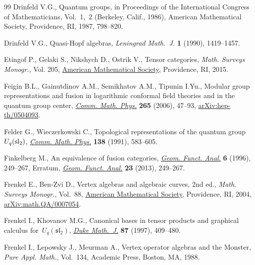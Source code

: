 \documentclass[pdftex]{sigma}
\numberwithin{equation}{section}
\begin{document}
\begin{thebibliography}{99}
Drinfeld V.G., Quantum groups, in Proceedings of the {I}nternational {C}ongress
 of {M}athematicians, {V}ol.~1,~2 ({B}erkeley, {C}alif., 1986), American
 Mathematical Society, Providence, RI, 1987, 798--820.

Drinfeld V.G., Quasi-{H}opf algebras, \textit{Leningrad Math.~J.} \textbf{1}
 (1990), 1419--1457.

Etingof P., Gelaki S., Nikshych D., Ostrik V., Tensor categories, \textit{Math.
 Surveys Monogr.}, Vol. 205, \href{https://doi.org/10.1090/surv/205}{American
 Mathematical Society}, Providence, RI, 2015.

Feigin B.L., Gainutdinov A.M., Semikhatov A.M., Tipunin I.Yu., Modular group
 representations and fusion in logarithmic conformal field theories and in the
 quantum group center,
 \href{https://doi.org/10.1007/s00220-006-1551-6}{\textit{Comm. Math. Phys.}}
 \textbf{265} (2006), 47--93,
 \href{http://arxiv.org/abs/hep-th/0504093}{arXiv:hep-th/0504093}.

Felder G., Wieczerkowski C., Topological representations of the quantum
 group~{$U_q({\rm sl}_2)$},
 \href{https://doi.org/10.1007/BF02102043}{\textit{Comm. Math. Phys.}}
 \textbf{138} (1991), 583--605.

Finkelberg M., An equivalence of fusion categories,
 \href{https://doi.org/10.1007/BF02247887}{\textit{Geom. Funct. Anal.}}
 \textbf{6} (1996), 249--267, {E}rratum,
 \href{https://doi.org/10.1007/s00039-013-0230-y}{\textit{Geom. Funct. Anal.}}
 \textbf{23} (2013), 249--267.

Frenkel E., Ben-Zvi D., Vertex algebras and algebraic curves, 2nd ed., \textit{Math.
 Surveys Monogr.}, Vol.~88,
 \href{https://doi.org/10.1090/surv/088}{American Mathematical Society},
 Providence, RI, 2004,
 \href{http://arxiv.org/abs/math.QA/0007054}{arXiv:math.QA/0007054}.

Frenkel I., Khovanov M.G., Canonical bases in tensor products and graphical
 calculus for~{$U_q({\mathfrak s}{\mathfrak l}_2)$},
 \href{https://doi.org/10.1215/S0012-7094-97-08715-9}{\textit{Duke Math.~J.}}
 \textbf{87} (1997), 409--480.

Frenkel I., Lepowsky J., Meurman A., Vertex operator algebras and the
 {M}onster, \textit{Pure Appl. Math.}, Vol.~134, Academic Press, Boston, MA,
 1988.


\end{thebibliography}
\end{document}
